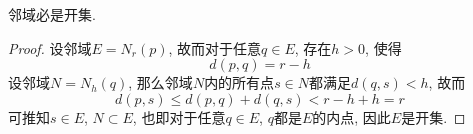 \documentclass[cn,12pt,math=mtpro2,citestyle=gb7714-2015,bibstyle=gb7714-2015,twocol]{elegantbook}
\begin{document}

\begin{theorem}
  邻域必是开集.
\end{theorem}
\begin{proof}
  设邻域$E=N_r(p)$, 故而对于任意$q \in E$, 存在$h>0$, 使得
  $$d(p,q)=r-h$$
  设邻域$N=N_h(q)$, 那么邻域$N$内的所有点$s\in N$都满足$d(q,s)<h$, 故而
  $$d(p,s)\leq d(p,q)+d(q,s)<r-h+h=r$$
  可推知$s\in E$, $N\subset E$, 也即对于任意$q\in E$, $q$都是$E$的内点, 因此$E$是开集.
\end{proof}
\end{document}
